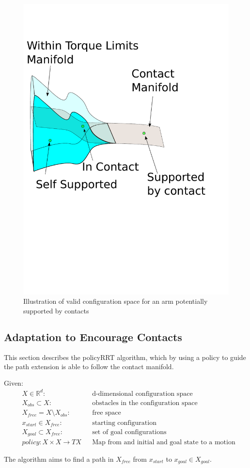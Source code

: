 \documentclass[../thesis.tex]{subfiles}
\begin{document}
\begin{figure}
  \centering
  \includegraphics[width=.5\linewidth]{./Planning/thin_manifold.pdf}
  
  \caption{Illustration of valid configuration space for an arm potentially supported by contacts}
  \label{fig:thin_manifold}
\end{figure}

\subsection{Adaptation to Encourage Contacts}
This section describes the policyRRT algorithm, which by using a policy to guide the path extension is able to follow the contact manifold.

Given:
\begin{align}
    &X \in \mathbb{R}^d:     &&\text{d-dimensional configuration space}\\
    &X_{obs} \subset X:      &&\text{obstacles in the configuration space}\\
    &X_{free} = X \setminus X_{obs}:   &&\text{free space}\\
    &x_{start} \in X_{free}:  &&\text{starting configuration}\\
    &X_{goal} \subset X_{free}: &&\text{set of goal configurations}\\
    &policy: X \times X \rightarrow TX &&\text{Map from and initial and goal state to a motion}
\end{align}

The algorithm aims to find a path in $X_{free}$ from $x_{start}$ to $x_{goal} \in X_{goal}$.
\end{document}
